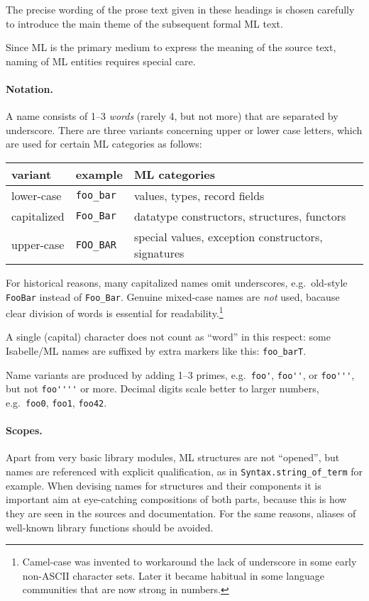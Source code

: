\begin{isabellebody}
\begin{isamarkuptext}
  \medskip The precise wording of the prose text given in these
  headings is chosen carefully to introduce the main theme of the
  subsequent formal ML text.%
\end{isamarkuptext}%
\isamarkuptrue%
%
\isamarkuptrue%
%
\begin{isamarkuptext}%
Since ML is the primary medium to express the meaning of the
  source text, naming of ML entities requires special care.

  \paragraph{Notation.}  A name consists of 1--3 \emph{words} (rarely
  4, but not more) that are separated by underscore.  There are three
  variants concerning upper or lower case letters, which are used for
  certain ML categories as follows:

  \medskip
  \begin{tabular}{lll}
  variant & example & ML categories \\\hline
  lower-case & \verb|foo_bar| & values, types, record fields \\
  capitalized & \verb|Foo_Bar| & datatype constructors, structures, functors \\
  upper-case & \verb|FOO_BAR| & special values, exception constructors, signatures \\
  \end{tabular}
  \medskip

  For historical reasons, many capitalized names omit underscores,
  e.g.\ old-style \verb|FooBar| instead of \verb|Foo_Bar|.
  Genuine mixed-case names are \emph{not} used, bacause clear division
  of words is essential for readability.\footnote{Camel-case was
  invented to workaround the lack of underscore in some early
  non-ASCII character sets.  Later it became habitual in some language
  communities that are now strong in numbers.}

  A single (capital) character does not count as ``word'' in this
  respect: some Isabelle/ML names are suffixed by extra markers like
  this: \verb|foo_barT|.

  Name variants are produced by adding 1--3 primes, e.g.\ \verb|foo'|, \verb|foo''|, or \verb|foo'''|, but not \verb|foo''''| or more.  Decimal digits scale better to larger numbers,
  e.g.\ \verb|foo0|, \verb|foo1|, \verb|foo42|.

  \paragraph{Scopes.}  Apart from very basic library modules, ML
  structures are not ``opened'', but names are referenced with
  explicit qualification, as in \verb|Syntax.string_of_term| for
  example.  When devising names for structures and their components it
  is important aim at eye-catching compositions of both parts, because
  this is how they are seen in the sources and documentation.  For the
  same reasons, aliases of well-known library functions should be
  avoided.


\end{isamarkuptext}
\end{isabellebody}

